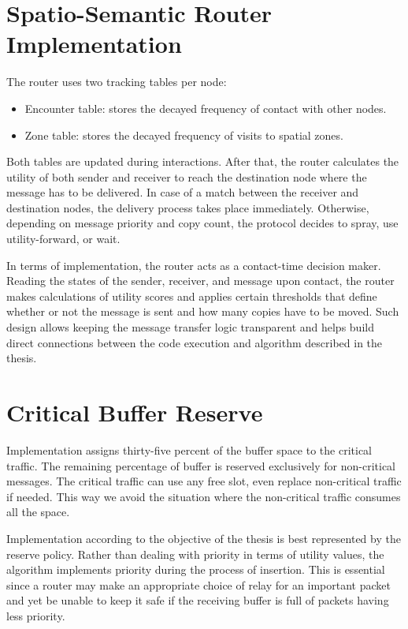 \section{Spatio-Semantic Router Implementation}
The router uses two tracking tables per node:

\begin{itemize}
	\item Encounter table: stores the decayed frequency of contact with other nodes.
	\item Zone table: stores the decayed frequency of visits to spatial zones.

\end{itemize}

Both tables are updated during interactions. After that, the router calculates the utility of both sender and receiver to reach the destination node where the message has to be delivered. In case of a match between the receiver and destination nodes, the delivery process takes place immediately. Otherwise, depending on message priority and copy count, the protocol decides to spray, use utility-forward, or wait.

In terms of implementation, the router acts as a contact-time decision maker. Reading the states of the sender, receiver, and message upon contact, the router makes calculations of utility scores and applies certain thresholds that define whether or not the message is sent and how many copies have to be moved. Such design allows keeping the message transfer logic transparent and helps build direct connections between the code execution and algorithm described in the thesis.

\section{Critical Buffer Reserve}
Implementation assigns thirty-five percent of the buffer space to the critical traffic. The remaining percentage of buffer is reserved exclusively for non-critical messages. The critical traffic can use any free slot, even replace non-critical traffic if needed. This way we avoid the situation where the non-critical traffic consumes all the space.

Implementation according to the objective of the thesis is best represented by the reserve policy. Rather than dealing with priority in terms of utility values, the algorithm implements priority during the process of insertion. This is essential since a router may make an appropriate choice of relay for an important packet and yet be unable to keep it safe if the receiving buffer is full of packets having less priority.

